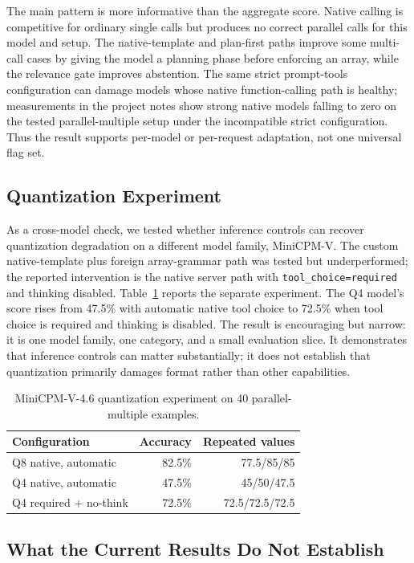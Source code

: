 \documentclass[conference]{IEEEtran}
\begin{document}
The main pattern is more informative than the aggregate score. Native calling is competitive
for ordinary single calls but produces no correct parallel calls for this model and setup. The
native-template and plan-first paths improve some multi-call cases by giving the model a planning
phase before enforcing an array, while the relevance gate improves abstention. The same strict prompt-tools configuration can damage models whose
native function-calling path is healthy; measurements in the project notes show strong native
models falling to zero on the tested parallel-multiple setup under the incompatible strict
configuration. Thus the result supports per-model or per-request adaptation, not one
universal flag set.

\subsection{Quantization Experiment}

As a cross-model check, we tested whether inference controls can recover quantization
degradation on a different model family, MiniCPM-V. The custom native-template plus foreign
array-grammar path was tested but underperformed; the reported intervention is the native
server path with \texttt{tool\_choice=required} and thinking disabled. Table~\ref{tab:quant}
reports the separate experiment. The Q4 model's score rises
from 47.5\% with automatic native tool choice to 72.5\% when tool choice is required and
thinking is disabled. The result is encouraging but narrow: it is one model family, one
category, and a small evaluation slice. It demonstrates that inference controls can matter
substantially; it does not establish that quantization primarily damages format rather than
other capabilities.

\begin{table}[h]
\centering
\caption{MiniCPM-V-4.6 quantization experiment on 40 parallel-multiple examples.}
\label{tab:quant}
\begin{tabular}{lrr}
\toprule
Configuration & Accuracy & Repeated values\\
\midrule
Q8 native, automatic & 82.5\% & 77.5/85/85\\
Q4 native, automatic & 47.5\% & 45/50/47.5\\
Q4 required + no-think & 72.5\% & 72.5/72.5/72.5\\
\bottomrule
\end{tabular}
\end{table}

\subsection{What the Current Results Do Not Establish}
\end{document}
